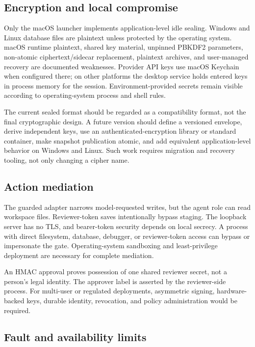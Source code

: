 \subsection{Encryption and local compromise}

Only the macOS launcher implements application-level idle sealing. Windows and Linux database files are plaintext unless protected by the operating system. macOS runtime plaintext, shared key material, unpinned PBKDF2 parameters, non-atomic ciphertext/sidecar replacement, plaintext archives, and user-managed recovery are documented weaknesses. Provider API keys use macOS Keychain when configured there; on other platforms the desktop service holds entered keys in process memory for the session. Environment-provided secrets remain visible according to operating-system process and shell rules.

The current sealed format should be regarded as a compatibility format, not the final cryptographic design. A future version should define a versioned envelope, derive independent keys, use an authenticated-encryption library or standard container, make snapshot publication atomic, and add equivalent application-level behavior on Windows and Linux. Such work requires migration and recovery tooling, not only changing a cipher name.

\subsection{Action mediation}

The guarded adapter narrows model-requested writes, but the agent role can read workspace files. Reviewer-token saves intentionally bypass staging. The loopback server has no TLS, and bearer-token security depends on local secrecy. A process with direct filesystem, database, debugger, or reviewer-token access can bypass or impersonate the gate. Operating-system sandboxing and least-privilege deployment are necessary for complete mediation.

An HMAC approval proves possession of one shared reviewer secret, not a person's legal identity. The approver label is asserted by the reviewer-side process. For multi-user or regulated deployments, asymmetric signing, hardware-backed keys, durable identity, revocation, and policy administration would be required.

\subsection{Fault and availability limits}

